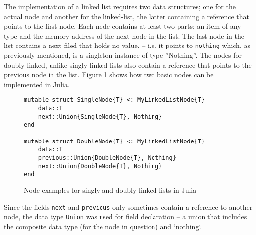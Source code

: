 \documentclass[a4paper, 11pt]{article}
\begin{document}
    The implementation of a linked list requires two data structures;
    one for the actual node and another for the linked-list, the latter containing a
    reference that points to the first node.
    Each node contains at least two parts; an item of any type and 
    the memory address of the next node in the list. 
    The last node in the list contains a next filed that holds no value.  
    -- i.e. it points to \texttt{nothing} which, as previously mentioned, is a 
    singleton instance of type ''Nothing''. 
    The nodes for doubly linked, unlike singly linked lists
    also contain a reference that points to the previous node in the list.
    Figure \ref{code:node} shows how two basic nodes can be implemented in Julia. 
    \begin{figure}[H]
        \centering
    \begin{verbatim}
mutable struct SingleNode{T} <: MyLinkedListNode{T}
    data::T
    next::Union{SingleNode{T}, Nothing}
end

mutable struct DoubleNode{T} <: MyLinkedListNode{T}
    data::T
    previous::Union{DoubleNode{T}, Nothing}
    next::Union{DoubleNode{T}, Nothing}
end
    \end{verbatim}
    \caption{Node examples for singly and doubly linked lists in Julia}
    \label{code:node}
    \end{figure}
    Since the fields \texttt{next} and \texttt{previous} only sometimes contain a
    reference to another node, the data type \texttt{Union} was used for field
    declaration -- a union that includes the composite
    data type (for the node in question) and `nothing`.
    
\end{document}
